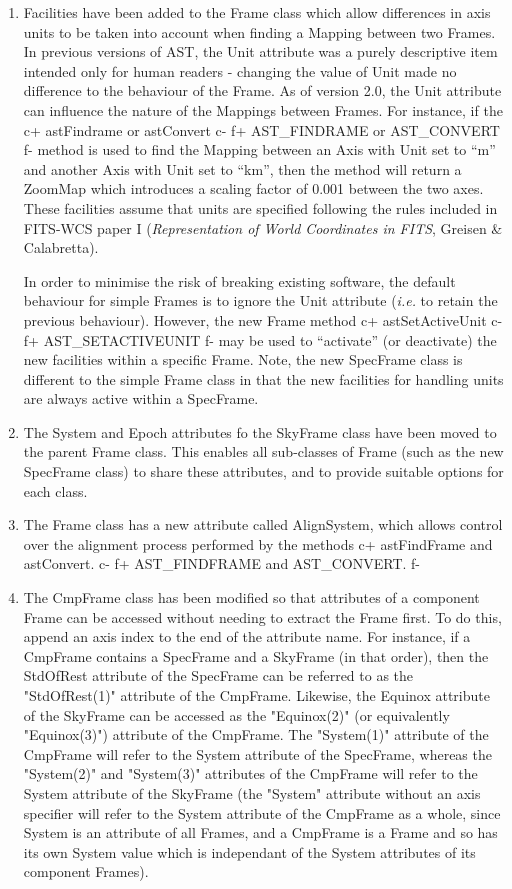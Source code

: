 \documentclass[twoside,11pt]{article}
\begin{document}
\begin{enumerate}
\item Facilities have been added to the Frame class which allow
differences in axis units to be taken into account when finding a Mapping
between two Frames. In previous versions of AST, the Unit attribute was a
purely descriptive item intended only for human readers - changing the
value of Unit made no difference to the behaviour of the Frame. As of
version 2.0, the Unit attribute can influence the nature of the Mappings
between Frames. For instance, if the 
c+
astFindrame or astConvert
c-
f+
AST\_FINDRAME or AST\_CONVERT
f-
method is used to find the Mapping between an Axis with Unit set to ``m''
and another Axis with Unit set to ``km'', then the method will return a 
ZoomMap which introduces a scaling factor of 0.001 between the two axes.
These facilities assume that units are specified following the rules
included in FITS-WCS paper I ({\em Representation of World
Coordinates in FITS}, Greisen \& Calabretta).

In order to minimise the risk of breaking existing software, the default 
behaviour for simple Frames is to ignore the Unit attribute ({\em{i.e.}}
to retain the previous behaviour). However, the new Frame method 
c+
astSetActiveUnit
c-
f+
AST\_SETACTIVEUNIT
f-
may be used to ``activate'' (or deactivate) the new facilities within a 
specific Frame. Note, the new SpecFrame class is different to the simple
Frame class in that the new facilities for handling units are always active
within a SpecFrame. 
 
\item The System and Epoch attributes fo the SkyFrame class have been
moved to the parent Frame class. This enables all sub-classes of Frame
(such as the new SpecFrame class) to share these attributes, and to provide
suitable options for each class.

\item The Frame class has a new attribute called AlignSystem, which allows 
control over the alignment process performed by the methods 
c+
astFindFrame and astConvert.
c-
f+
AST\_FINDFRAME and AST\_CONVERT.
f-


\item The CmpFrame class has been modified so that attributes of a 
component Frame can be accessed without needing to extract the Frame first.
To do this, append an axis index to the end of the attribute name. For
instance, if a CmpFrame contains a SpecFrame and a SkyFrame (in that order), 
then the StdOfRest attribute of the SpecFrame can be referred to as the
"StdOfRest(1)" attribute of the CmpFrame. Likewise, the Equinox attribute
of the SkyFrame can be accessed as the "Equinox(2)" (or equivalently
"Equinox(3)") attribute of the CmpFrame. The "System(1)" attribute of the
CmpFrame will refer to the System attribute of the SpecFrame, whereas the 
"System(2)" and "System(3)" attributes of the CmpFrame will refer to the
System attribute of the SkyFrame (the "System" attribute without an axis
specifier will refer to the System attribute of the CmpFrame as a whole,
since System is an attribute of all Frames, and a CmpFrame is a Frame and
so has its own System value which is independant of the System attributes
of its component Frames).


\end{enumerate}
\end{document}
